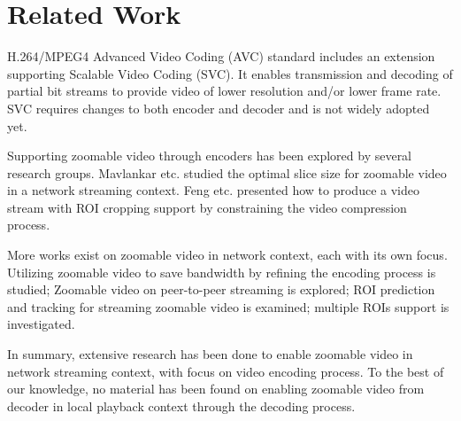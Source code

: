 \section{Related Work}
H.264/MPEG4 Advanced Video Coding (AVC) standard includes an extension supporting Scalable Video Coding (SVC)\cite{Schwarz07overviewof}. It enables transmission and decoding of partial bit streams to provide video of lower resolution and/or lower frame rate. SVC requires changes to both encoder and decoder and is not widely adopted yet. 

Supporting zoomable video through encoders has been explored by several research groups. Mavlankar etc. studied the optimal slice size for zoomable video in a network streaming context\cite{Mavlankar07optimalslice}. Feng etc. presented how to produce a video stream  with ROI cropping support by constraining the video compression process\cite{Feng:2011:SRC:2000486.2000491}. 

More works exist on zoomable video in network context, each with its own focus. Utilizing zoomable video to save bandwidth by refining the encoding process is studied\cite{Ngo:2011:AEZ:1943552.1943581}; Zoomable video on peer-to-peer streaming is explored\cite{Mavlankar_peer-to-peermulticast}; ROI prediction and tracking for streaming zoomable video is examined\cite{roi_pred}\cite{roi02}\cite{Fan03lookinginto}; multiple ROIs support is investigated\cite{multiroi}. 

In summary, extensive research has been done to enable zoomable video in network streaming context, with focus on video encoding process. To the best of our knowledge, no material has been found on enabling zoomable video from decoder in local playback context through the decoding process.  
